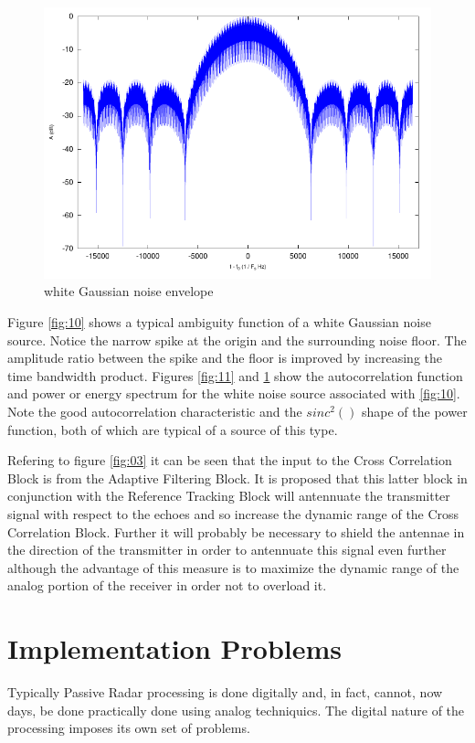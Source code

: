 \documentclass[a4paper]{report}
\numberwithin{equation}{chapter}
\begin{document}
\begin{figure}
\centering 
\includegraphics{Passive-Weather-Radar-Theory-fig-12.pdf}
\caption[white Gaussian noise envelope]{white Gaussian noise envelope}
\label{fig:12}
\end{figure}

\bigskip

Figure \ref{fig:10} shows a typical ambiguity function of a white Gaussian noise source. Notice the narrow spike at the origin and the surrounding noise floor. The amplitude ratio between the spike and the floor is improved by increasing the time bandwidth product. Figures \ref{fig:11} and \ref{fig:12} show the autocorrelation function and power or energy spectrum for the white noise source associated with \ref{fig:10}. Note the good autocorrelation characteristic and the $sinc^2()$ shape of the power function, both of which are typical of a source of this type.

\bigskip

Refering to figure \ref{fig:03} it can be seen that the input to the Cross Correlation Block is from the Adaptive Filtering Block. It is proposed that this latter block in conjunction with the Reference Tracking Block will antennuate the transmitter signal with respect to the echoes and so increase the dynamic range of the Cross Correlation Block. Further it will probably be necessary to shield the antennae in the direction of the transmitter in order to antennuate this signal even further although the advantage of this measure is to maximize the dynamic range of the analog portion of the receiver in order not to overload it.

\section[Implementation Problems]{Implementation Problems}
Typically Passive Radar processing is done digitally and, in fact, cannot, now days, be done practically done using analog techniquics. The digital nature of the processing imposes its own set of problems.
\end{document}
